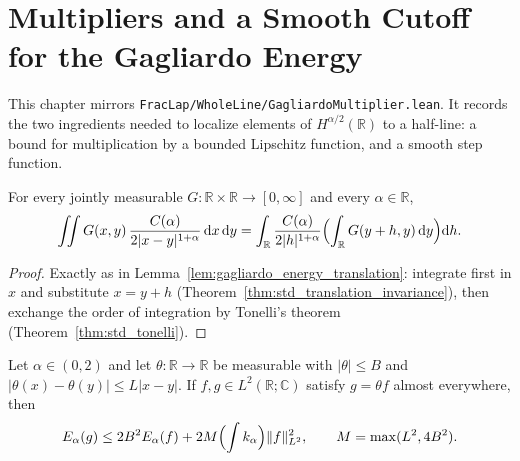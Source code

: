 \chapter{Multipliers and a Smooth Cutoff for the Gagliardo Energy}

This chapter mirrors \texttt{FracLap/WholeLine/GagliardoMultiplier.lean}. It records the two ingredients needed to localize elements of $H^{\alpha/2}(\mathbb{R})$ to a half-line: a bound for multiplication by a bounded Lipschitz function, and a smooth step function.

\begin{lemma}\label{lem:gagliardo_shear}
\leanok
For every jointly measurable $G : \mathbb{R} \times \mathbb{R} \to [0, \infty]$ and every $\alpha \in \mathbb{R}$,
\[
  \iint G(x, y)\, \frac{C(\alpha)}{2 \lvert x - y \rvert^{1 + \alpha}} \, \mathrm{d}x\, \mathrm{d}y
  = \int_{\mathbb{R}} \frac{C(\alpha)}{2 \lvert h \rvert^{1 + \alpha}} \Bigl( \int_{\mathbb{R}} G(y + h, y)\, \mathrm{d}y \Bigr) \mathrm{d}h.
\]
\end{lemma}

\begin{proof}
\leanok
Exactly as in Lemma~\ref{lem:gagliardo_energy_translation}: integrate first in $x$ and substitute $x = y + h$ (Theorem~\ref{thm:std_translation_invariance}), then exchange the order of integration by Tonelli's theorem (Theorem~\ref{thm:std_tonelli}).
\end{proof}

\begin{theorem}\label{thm:gagliardo_multiplier}
\leanok
Let $\alpha \in (0, 2)$ and let $\theta : \mathbb{R} \to \mathbb{R}$ be measurable with $\lvert \theta \rvert \le B$ and $\lvert \theta(x) - \theta(y) \rvert \le L \lvert x - y \rvert$. If $f, g \in L^2(\mathbb{R}; \mathbb{C})$ satisfy $g = \theta f$ almost everywhere, then
\[
  E_\alpha(g) \le 2 B^2 E_\alpha(f) + 2 M \Bigl( \int k_\alpha \Bigr) \lVert f \rVert_{L^2}^2, \qquad M = \max(L^2, 4 B^2).
\]
\end{theorem}

